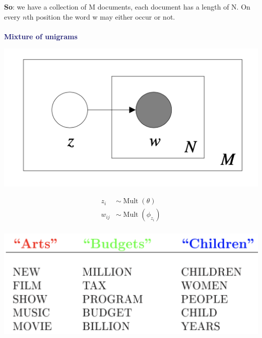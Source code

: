 \begin{enumerate}
    \textbf{So}: we have a collection of M documents, each document has a length of N. On every $n$th position the word w may either occur or not.
    \\
    \\
    \textbf{\textcolor{MidnightBlue}{Mixture of unigrams}} \\
    \begin{minipage}{0.3\textwidth}
        \includegraphics[scale=0.5]{figures/uni2.png}
    \end{minipage}
    \begin{minipage}{0.2\textwidth}
        $$
        \begin{aligned}
        z_{i} & \sim \operatorname{Mult}(\theta) \\
        w_{i j} & \sim \operatorname{Mult}\left(\phi_{z_{i}}\right) \\
        &
        \end{aligned}
        $$
    \end{minipage}
    \begin{minipage}{0.5\textwidth}
        \;\;\; \includegraphics[scale=0.6]{figures/mixture.png}
    \end{minipage}
    

\end{enumerate}

